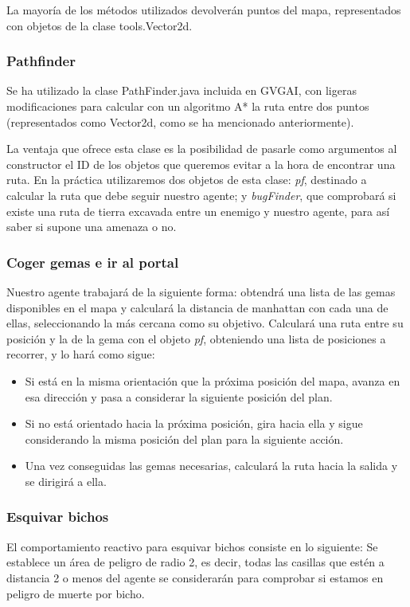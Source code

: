 \documentclass[11pt,a4paper]{article}
\begin{document}
La mayoría de los métodos utilizados devolverán puntos del mapa, representados con objetos de la clase tools.Vector2d.


\subsubsection{Pathfinder}
Se ha utilizado la clase PathFinder.java incluida en GVGAI, con ligeras modificaciones para calcular con un 
algoritmo A* la ruta entre dos puntos (representados como Vector2d, como se ha mencionado anteriormente). 

La ventaja que ofrece esta clase es la posibilidad de pasarle como argumentos al constructor el ID de los objetos que queremos 
evitar a la hora de encontrar una ruta. En la práctica utilizaremos dos objetos de esta clase: \textit{pf}, destinado a calcular la 
ruta que debe seguir nuestro agente; y \textit{bugFinder}, que comprobará si existe una ruta de tierra excavada entre un enemigo y nuestro agente, para así saber si supone una amenaza o no.


\subsubsection{Coger gemas e ir al portal}
Nuestro agente trabajará de la siguiente forma: obtendrá una lista de las gemas disponibles en el mapa y calculará la distancia de manhattan con cada una de ellas, seleccionando la más cercana como su objetivo. Calculará una ruta entre su posición y la de la gema con el objeto \textit{pf}, obteniendo una lista de posiciones a recorrer, y lo hará como sigue:

\begin{itemize}
\item Si está en la misma orientación que la próxima posición del mapa, avanza en esa dirección y pasa a considerar la siguiente
posición del plan.
\item Si no está orientado hacia la próxima posición, gira hacia ella y sigue considerando la misma posición del plan para la siguiente acción.
\item Una vez conseguidas las gemas necesarias, calculará la ruta hacia la salida y se dirigirá a ella.
\end{itemize}


\subsubsection{Esquivar bichos}
El comportamiento reactivo para esquivar bichos consiste en lo siguiente:
Se establece un área de peligro de radio 2, es decir, todas las casillas que estén a distancia 2 o menos del agente
se considerarán para comprobar si estamos en peligro de muerte por bicho.
\end{document}

